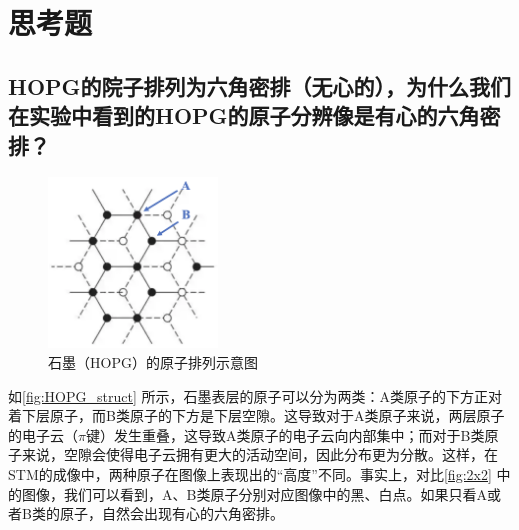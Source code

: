 \documentclass[font=default]{mpltx}
\begin{document}
\appendix

\section{思考题}
\subsection{HOPG的院子排列为六角密排（无心的），为什么我们在实验中看到的HOPG的原子分辨像是有心的六角密排？}
\begin{figure}
  \centering
  \includegraphics[width=0.4\textwidth]{fig/HOPG_struct.png}
  \caption{石墨（HOPG）的原子排列示意图}
  \label{fig:HOPG_struct}
\end{figure}
如\autoref{fig:HOPG_struct} 所示，石墨表层的原子可以分为两类：A类原子的下方正对着下层原子，而B类原子的下方是下层空隙。这导致对于A类原子来说，两层原子的电子云（$\pi$键）发生重叠，这导致A类原子的电子云向内部集中；而对于B类原子来说，空隙会使得电子云拥有更大的活动空间，因此分布更为分散。这样，在STM的成像中，两种原子在图像上表现出的“高度”不同。事实上，对比\autoref{fig:2x2} 中的图像，我们可以看到，A、B类原子分别对应图像中的黑、白点。如果只看A或者B类的原子，自然会出现有心的六角密排。
\end{document}
